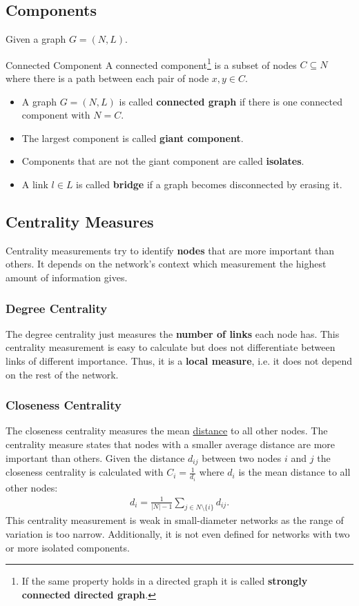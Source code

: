 \documentclass[english]{panikzettel}
\begin{document}
\subsection{Components}\label{sec:components}
Given a graph $ G = (N,L) $.

\begin{defi}{Connected Component}
	A connected component\footnote{If the same property holds in a directed graph it is called \textbf{strongly connected directed graph}.} is a subset of nodes $ C \subseteq N $ where there is a path between each pair of node $ x,y \in C $.
	
\begin{itemize}
	\item A graph $ G = (N,L) $ is called \textbf{connected graph} if there is one connected component with $ N = C $.
	\item The largest component is called \textbf{giant component}.
	\item Components that are not the giant component are called \textbf{isolates}.
	\item A link $ l \in L $ is called \textbf{bridge} if a graph becomes disconnected by erasing it.
\end{itemize}
\end{defi}

\subsection{Centrality Measures}
Centrality measurements try to identify \textbf{nodes} that are more important than others. 
It depends on the network's context which measurement the highest amount of information gives.

\subsubsection{Degree Centrality}
The degree centrality just measures the \textbf{number of links} each node has. 
This centrality measurement is easy to calculate but does not differentiate between links of different importance. 
Thus, it is a \textbf{local measure}, i.e. it does not depend on the rest of the network.

\subsubsection{Closeness Centrality}
The closeness centrality measures the mean \hyperref[sec:distance]{distance} to all other nodes. 
The centrality measure states that nodes with a smaller average distance are more important than others. 
Given the distance $ d_{ij} $ between two nodes $ i $ and $ j $ the closeness centrality is calculated with $ C_i = \frac{1}{d_i} $ where $ d_i $ is the mean distance to all other nodes:
\begin{align*}
	d_i = \frac{1}{|N| - 1} \sum\limits_{j \in N \setminus \{i\}} d_{ij}.
\end{align*}
This centrality measurement is weak in small-diameter networks as the range of variation is too narrow. 
Additionally, it is not even defined for networks with two or more isolated components.
\end{document}
